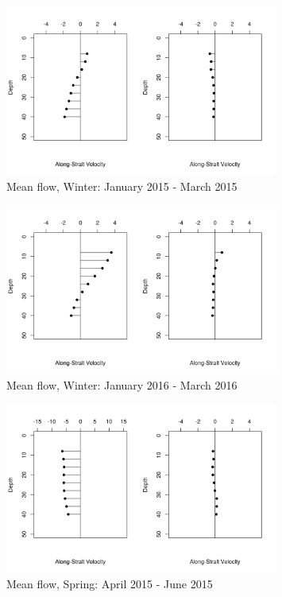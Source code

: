 \documentclass[12pt]{dforeport}
\begin{document}
\begin{figure}  
\centering
\includegraphics[width = 0.8\textwidth]{./figures/42_smf_winter_2015.png}
\caption[Mean flow, Winter, 2015]{Mean flow, Winter: January 2015 - March 2015}
\label{f:smf_w_2015}
\end{figure}

\begin{figure}  
\centering
\includegraphics[width = 0.8\textwidth]{./figures/43_smf_winter_2016.png}
\caption[Mean flow, Winter, 2016]{Mean flow, Winter: January 2016 - March 2016}
\label{f:smf_w_2016}
\end{figure}


\begin{figure}  
\centering
\includegraphics[width = 0.8\textwidth]{./figures/44_smf_spring_2015.png}
\caption[Mean flow, Spring, 2015]{Mean flow, Spring: April 2015 - June 2015}
\label{f:smf_s_2015}
\end{figure}
\end{document}
